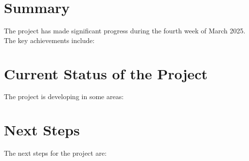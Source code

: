 \documentclass[12pt]{article}
\begin{document}
\section{Summary}
The project has made significant progress during the fourth
week of March 2025. The key achievements include:


\section {Current Status of the Project}
The project is developing in some areas:


\section{Next Steps}
The next steps for the project are:

\printbibliography
\end{document}
